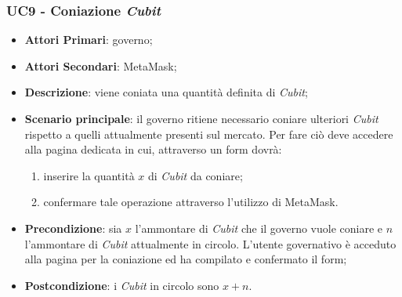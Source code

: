 \subsubsection{UC9 - Coniazione \textit{Cubit}}
\begin{itemize}
	\item \textbf{Attori Primari}: governo;
	\item \textbf{Attori Secondari}: MetaMask\glo;
	\item \textbf{Descrizione}: viene coniata una quantità definita di \textit{Cubit}\glo;
	
	\item \textbf{Scenario principale}: il governo ritiene necessario coniare ulteriori \textit{Cubit} rispetto a quelli attualmente presenti sul mercato. Per fare ciò deve accedere alla pagina dedicata in cui, attraverso un form dovrà:
	 \begin{enumerate}[label=\alph*.]
		\item inserire la quantità $x$ di \textit{Cubit} da coniare;
		\item confermare tale operazione attraverso l'utilizzo di MetaMask\glo.
	\end{enumerate}
	\item \textbf{Precondizione}: sia $x$ l'ammontare di \textit{Cubit} che il governo 
	vuole coniare e $n$ l'ammontare di \textit{Cubit} attualmente in circolo. L'utente 
	governativo è acceduto alla pagina per la coniazione ed ha compilato e 
	confermato il form;
	\item \textbf{Postcondizione}: i \textit{Cubit} in circolo sono $x+n$.
\end{itemize}
